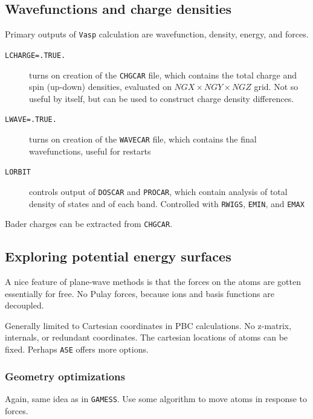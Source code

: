 \documentclass[11pt]{article}
\begin{document}
\subsection{Wavefunctions and charge densities}
\label{sec:org346faa2}
Primary outputs of \texttt{Vasp} calculation are wavefunction, density, energy, and forces.

\begin{description}
\item[{\texttt{LCHARGE=.TRUE.}}] turns on creation of the \texttt{CHGCAR} file, which contains the total charge and spin (up-down) densities, evaluated on \(NGX \times NGY \times NGZ\) grid.  Not so useful by itself, but can be used to construct charge density differences.
\item[{\texttt{LWAVE=.TRUE.}}] turns on creation of the \texttt{WAVECAR} file, which contains the final wavefunctions, useful for restarts
\item[{\texttt{LORBIT}}] controls output of \texttt{DOSCAR} and \texttt{PROCAR}, which contain analysis of total density of states and of each band.  Controlled with \texttt{RWIGS}, \texttt{EMIN}, and \texttt{EMAX}
\end{description}

Bader charges can be extracted from \texttt{CHGCAR}.
\subsection{Exploring potential energy surfaces}
\label{sec:org5302ade}
A nice feature of plane-wave methods is that the forces on the atoms are gotten essentially for free.  No Pulay forces, because ions and basis functions are decoupled.

Generally limited to Cartesian coordinates in PBC calculations. No z-matrix, internals, or redundant coordinates.  The cartesian locations of atoms can be fixed.  Perhaps \texttt{ASE} offers more options.

\subsubsection{Geometry optimizations}
\label{sec:orgd98ed9b}
Again, same idea as in \texttt{GAMESS}.  Use some algorithm to move atoms in response to forces.
\end{document}
